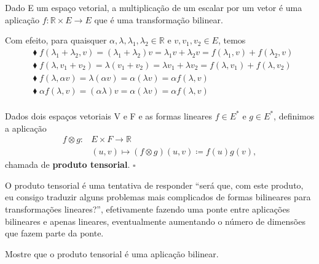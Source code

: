 \documentclass[../differential_forms.tex]{subfiles}
\begin{document}
\begin{example}
	Dado E um espaço vetorial, a multiplicação de um escalar por um vetor é uma aplicação \(f:\mathbb{R}\times E\rightarrow E\) que é uma transformação bilinear.

	Com efeito, para quaisquer \(\alpha , \lambda , \lambda_1,\lambda_2\in \mathbb{R}\) e \(v, v_1, v_2\in E\), temos
	\begin{align*}
		 & \blacklozenge\; f(\lambda_1+\lambda_2, v) = (\lambda_1+\lambda_2)v = \lambda_1 v + \lambda_2 v = f(\lambda_1, v)+f(\lambda_2, v) \\
		 & \blacklozenge\; f(\lambda, v_1+v_2) = \lambda(v_1+v_2) = \lambda v_1 + \lambda v_2 = f(\lambda, v_1)+f(\lambda, v_2)             \\
		 & \blacklozenge\; f(\lambda, \alpha v) = \lambda (\alpha v) = \alpha (\lambda v)= \alpha f(\lambda, v)                             \\
		 & \blacklozenge\; \alpha f(\lambda, v) = (\alpha \lambda) v = \alpha (\lambda v)= \alpha f(\lambda, v)                             \\
	\end{align*}
\end{example}
\begin{def*}
	Dados dois espaços vetoriais V e F e as formas lineares \(f\in E^{*}\) e \(g\in E^{*}\), definimos a aplicação
	\begin{align*}
		f\otimes g: & E\times F\rightarrow\mathbb{R}                          \\
		            & (u, v)\longmapsto (f\otimes g)(u, v)\coloneqq f(u)g(v),
	\end{align*}
	chamada de \textbf{produto tensorial}. \(\square\)
\end{def*}
O produto tensorial é uma tentativa de responder ``será que, com este produto, eu consigo traduzir alguns problemas mais complicados de formas bilineares para transformações lineares?'', efetivamente fazendo uma ponte entre aplicações bilineares e apenas lineares, eventualmente aumentando o número de dimensões que fazem parte da ponte.
\begin{exr}
	Mostre que o produto tensorial é uma aplicação bilinear.

\end{exr}
\end{document}

